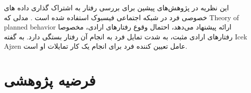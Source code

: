   این نظریه در پژوهش‌های پیشین برای بررسی رفتار
  به اشتراک گذاری داده های خصوصی
  فرد در شبکه اجتماعی فیسبوک استفاده شده است
  \!\citep{vanderschyffInformationPrivacyBehavior2020}
  \!.
  مدلی که
  \!\gls{Theory of planned behavior}
  ارائه پیشنهاد می‌دهد، احتمال وقوع  رفتار‌های ارادی، مخصوصا رفتار‌های ارادی مثبت، به شدت تمایل فرد به
  انجام آن رفتار بستگی دارد. به گفته
  \gls{Icek Ajzen}
  عامل تعیین کننده فرد برای انجام یک کار تمایلات او است.
\fi



\section{فرضیه پژوهشی}



